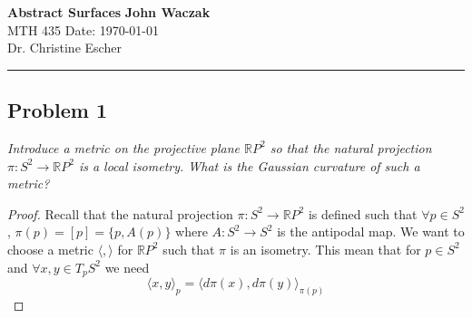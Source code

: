 \documentclass[a4paper, 11pt]{article}
\begin{document}
\noindent
\large\textbf{Abstract Surfaces} \hfill \textbf{John Waczak} \\
\normalsize MTH 435 \hfill  Date: \today \\
Dr. Christine Escher \\
\par\noindent\rule{\textwidth}{0.4pt}	
	
\subsection*{Problem 1}
	\textit{Introduce a metric on the projective plane $\mathbb{R}P^2$ so that the natural projection $\pi:S^2\to\mathbb{R}P^2$ is a local isometry. What is the Gaussian curvature of such a metric?}

	\begin{proof}
		Recall that the natural projection $\pi:S^2\to\mathbb{R}P^2$ is defined such that $\forall p \in S^2$, $\pi(p) = [p] = \{p, A(p)\}$ where $A:S^2\to S^2$ is the antipodal map. We want to choose a metric $\langle , \rangle$ for $\mathbb{R}P^2$ such that $\pi$ is an isometry. This mean that for $p\in S^2$ and $\forall x,y \in T_p S^2$ we need 	
			\begin{equation*}
				\big\langle x,y \big\rangle_p = \big\langle d\pi(x), d\pi(y) \big\rangle_{\pi(p)}
			\end{equation*}
		

\end{proof}
\end{document}
